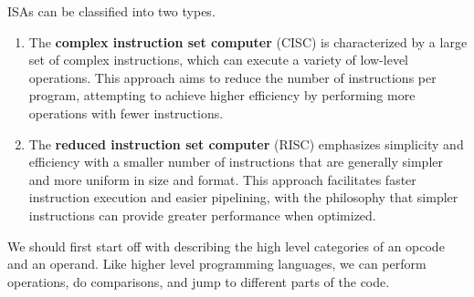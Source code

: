   \begin{example}
    \label{ex:cisc-vs-risc}
    ISAs can be classified into two types. 
    \begin{enumerate} 
      \item The \textbf{complex instruction set computer} (CISC) is characterized by a large set of complex instructions, which can execute a variety of low-level operations. This approach aims to reduce the number of instructions per program, attempting to achieve higher efficiency by performing more operations with fewer instructions.
      \item The \textbf{reduced instruction set computer} (RISC) emphasizes simplicity and efficiency with a smaller number of instructions that are generally simpler and more uniform in size and format. This approach facilitates faster instruction execution and easier pipelining, with the philosophy that simpler instructions can provide greater performance when optimized.
    \end{enumerate}
  \end{example}

  We should first start off with describing the high level categories of an opcode and an operand. Like higher level programming languages, we can perform operations, do comparisons, and jump to different parts of the code. 

